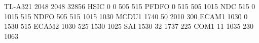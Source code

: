 TL-A321 2048 2048 32856
HSIC            0     0   505   515
PFDFO           0   515   505  1015
NDC           515     0  1015   515
NDFO          505   515  1015  1030
MCDU1        1740    50  2010   300
ECAM1        1030     0  1530   515
ECAM2        1030   525  1530  1025
SAI          1530    32  1737   225
COM1           11  1035   230  1063
